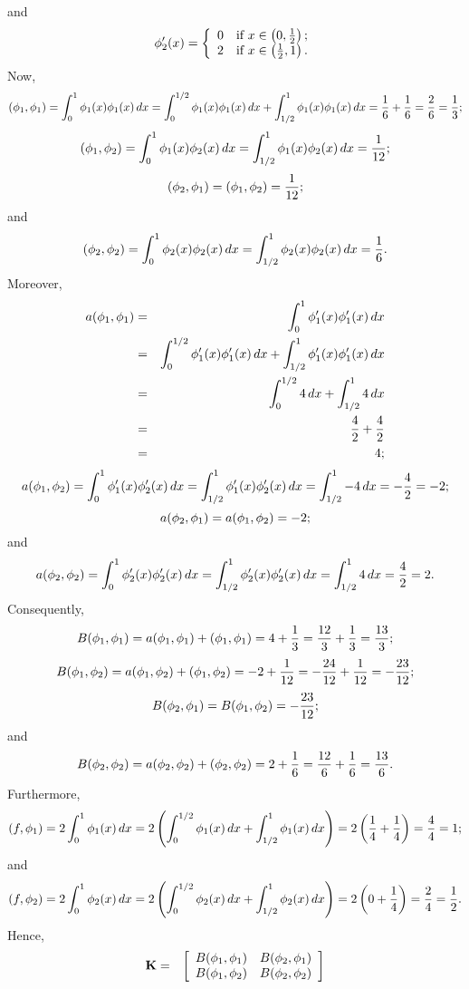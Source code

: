\begin{solution}
\begin{enumerate}
\[\]
and
\[
\phi_2'(x) = \left\{\begin{array}{ll}
0 & \mbox{if }x\in\left(0,{1 \over 2}\right); \\ 2 & \mbox{if }x\in\left({1 \over 2},1\right).\end{array}\right.
\]
Now,
\[
(\phi_1,\phi_1)=\int_0^1\phi_1(x)\phi_1(x)\,dx=\int_0^{1/2}\phi_1(x)\phi_1(x)\,dx+\int_{1/2}^1\phi_1(x)\phi_1(x)\,dx={1 \over 6}+{1 \over 6}={2 \over 6}={1 \over 3};
\]
\[
(\phi_1,\phi_2)=\int_0^1\phi_1(x)\phi_2(x)\,dx=\int_{1/2}^1\phi_1(x)\phi_2(x)\,dx={1 \over 12};
\]
\[
(\phi_2,\phi_1)=(\phi_1,\phi_2)={1 \over 12};
\]
and
\[
(\phi_2,\phi_2)=\int_0^1\phi_2(x)\phi_2(x)\,dx=\int_{1/2}^1\phi_2(x)\phi_2(x)\,dx={1 \over 6}.
\]
Moreover,
\begin{eqnarray*}
a(\phi_1,\phi_1)&=&\int_0^1\phi_1'(x)\phi_1'(x)\,dx
\\
&=&\int_0^{1/2}\phi_1'(x)\phi_1'(x)\,dx+\int_{1/2}^1\phi_1'(x)\phi_1'(x)\,dx
\\
&=&\int_0^{1/2}4\,dx+\int_{1/2}^14\,dx
\\
&=&{4 \over 2}+{4 \over 2}
\\
&=&4;
\end{eqnarray*}
\[
a(\phi_1,\phi_2)=\int_0^1\phi_1'(x)\phi_2'(x)\,dx=\int_{1/2}^1\phi_1'(x)\phi_2'(x)\,dx=\int_{1/2}^1-4\,dx=-{4 \over 2}=-2;
\]
\[
a(\phi_2,\phi_1)=a(\phi_1,\phi_2)=-2;
\]
and
\[
a(\phi_2,\phi_2)=\int_0^1\phi_2'(x)\phi_2'(x)\,dx=\int_{1/2}^1\phi_2'(x)\phi_2'(x)\,dx=\int_{1/2}^14\,dx={4 \over 2}=2.
\]
Consequently,
\[
B(\phi_1,\phi_1)=a(\phi_1,\phi_1)+(\phi_1,\phi_1)=4+{1 \over 3}={12 \over 3}+{1 \over 3}={13 \over 3};
\]
\[
B(\phi_1,\phi_2)=a(\phi_1,\phi_2)+(\phi_1,\phi_2)=-2+{1 \over 12}=-{24 \over 12}+{1 \over 12}=-{23 \over 12};
\]
\[
B(\phi_2,\phi_1)=B(\phi_1,\phi_2)=-{23 \over 12};
\]
and
\[
B(\phi_2,\phi_2)=a(\phi_2,\phi_2)+(\phi_2,\phi_2)=2+{1 \over 6}={12 \over 6}+{1 \over 6}={13 \over 6}.
\]
Furthermore,
\[
(f,\phi_1)=2\int_0^1\phi_1(x)\,dx=2\left(\int_0^{1/2}\phi_1(x)\,dx+\int_{1/2}^1\phi_1(x)\,dx\right)=2\left({1 \over 4}+{1 \over 4}\right)={4 \over 4}=1;
\]
and
\[
(f,\phi_2)=2\int_0^1\phi_2(x)\,dx=2\left(\int_0^{1/2}\phi_2(x)\,dx+\int_{1/2}^1\phi_2(x)\,dx\right)=2\left(0+{1 \over 4}\right)={2 \over 4}={1 \over 2}.
\]
Hence,
\begin{eqnarray*}
\BK&=&\left[\begin{array}{cc} B\ip{\phi_1,\phi_1} & B\ip{\phi_2,\phi_1} \\ B\ip{\phi_1,\phi_2} & B\ip{\phi_2,\phi_2}\end{array}\right]

\end{eqnarray*}
\end{enumerate}
\end{solution}
